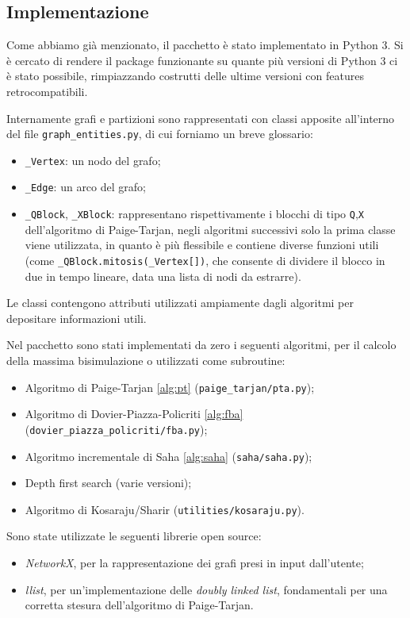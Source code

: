 \subsection{Implementazione}
Come abbiamo già menzionato, il pacchetto è stato implementato in Python 3. Si è cercato di rendere il package funzionante su quante più versioni di Python 3 ci è stato possibile, rimpiazzando costrutti delle ultime versioni con features retrocompatibili.

Internamente grafi e partizioni sono rappresentati con classi apposite all'interno del file \verb|graph_entities.py|, di cui forniamo un breve glossario:
\begin{itemize}
    \item \verb|_Vertex|: un nodo del grafo;
    \item \verb|_Edge|: un arco del grafo;
    \item \verb|_QBlock|, \verb|_XBlock|: rappresentano rispettivamente i blocchi di tipo \verb|Q|,\verb|X| dell'algoritmo di Paige-Tarjan, negli algoritmi successivi solo la prima classe viene utilizzata, in quanto è più flessibile e contiene diverse funzioni utili (come \verb|_QBlock.mitosis(_Vertex[])|, che consente di dividere il blocco in due in tempo lineare, data una lista di nodi da estrarre).
\end{itemize}
Le classi contengono attributi utilizzati ampiamente dagli algoritmi per depositare informazioni utili.

Nel pacchetto sono stati implementati da zero i seguenti algoritmi, per il calcolo della massima bisimulazione o utilizzati come subroutine:
\begin{itemize}
    \item Algoritmo di Paige-Tarjan \ref{alg:pt} (\verb|paige_tarjan/pta.py|);
    \item Algoritmo di Dovier-Piazza-Policriti \ref{alg:fba} (\verb|dovier_piazza_policriti/fba.py|);
    \item Algoritmo incrementale di Saha \ref{alg:saha} (\verb|saha/saha.py|);
    \item Depth first search (varie versioni);
    \item Algoritmo di Kosaraju/Sharir \cite{sharir} (\verb|utilities/kosaraju.py|).
\end{itemize}

Sono state utilizzate le seguenti librerie open source:
\begin{itemize}
    \item \emph{NetworkX}, per la rappresentazione dei grafi presi in input dall'utente;
    \item \emph{llist}, per un'implementazione delle \emph{doubly linked list}, fondamentali per una corretta stesura dell'algoritmo di Paige-Tarjan.
\end{itemize}
